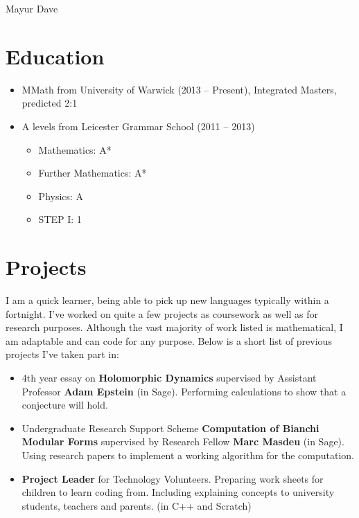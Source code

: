 \documentclass[letterpaper]{article}
\def\name{Mayur Dave}
\begin{document}
	
	{\huge \name}
	
	\vspace{0.25in}
	

	\section*{Education}
	
	\begin{itemize}
		\item MMath from University of Warwick (2013 -- Present), Integrated Masters, predicted 2:1
		
		\item A levels from Leicester Grammar School (2011 -- 2013)
		\begin{itemize}
			\item Mathematics: A*
			\item Further Mathematics:  A*
			\item Physics:  A
			\item STEP I:  1
		\end{itemize}
	\end{itemize}
	
	
	\section*{Projects}
	
	I am a quick learner, being able to pick up new languages typically within a fortnight. I've worked on quite a few projects as coursework as well as for research purposes. Although the vast majority of work listed is mathematical, I am adaptable and can code for any purpose. Below is a short list of previous projects I've taken part in:
	
	\begin{itemize}
		\item 4th year essay on \textbf{Holomorphic Dynamics} supervised by Assistant Professor \textbf{Adam Epstein} (in Sage). Performing calculations to show that a conjecture will hold.
		
		\item Undergraduate Research Support Scheme \textbf{Computation of Bianchi Modular Forms} supervised by Research Fellow \textbf{Marc Masdeu} (in Sage). Using research papers to implement a working algorithm for the computation.
		
		\item \textbf{Project Leader} for Technology Volunteers. Preparing work sheets for children to learn coding from. Including explaining concepts to university students, teachers and parents. (in C++ and Scratch)
	\end{itemize}
\end{document}
